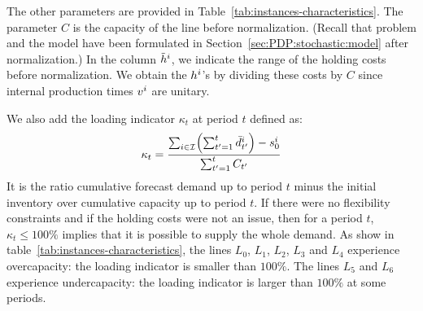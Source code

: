 The other parameters are provided in Table~\ref{tab:instances-characteristics}.
The parameter $C$ is the capacity of the line before normalization. (Recall that problem and the model have been formulated in Section~\ref{sec:PDP:stochastic:model} after normalization.)
In the column $\tilde{h}^i$, we indicate the range of the holding costs before normalization. We obtain the $h^i$'s by dividing these costs by $C$ since internal production times $v^i$ are unitary.

We also add the loading indicator $\kappa_t$ at period $t$ defined as:
\begin{equation}
  \kappa_t = \frac{\sum_{i\in\REF} \bracket{\sum_{t'=1}^{t} \bar\demand_{t'}^i}-\inventory_0^i}{ \sum_{t'=1}^{t} \capacity_{t'}}
\end{equation}
It is the ratio cumulative forecast demand up to period $t$ minus the initial inventory over cumulative capacity up to period $t$. If there were no flexibility constraints and if the holding costs were not an issue, then for a period $t$, $\kappa_t \le 100\%$ implies that it is possible to supply the whole demand. As show in table~\ref{tab:instances-characteristics}, the lines $L_0$, $L_1$, $L_2$, $L_3$ and $L_4$ experience overcapacity: the loading indicator is smaller than $100\%$. The lines $L_5$ and $L_6$ experience undercapacity: the loading indicator is larger than $100\%$ at some periods.

